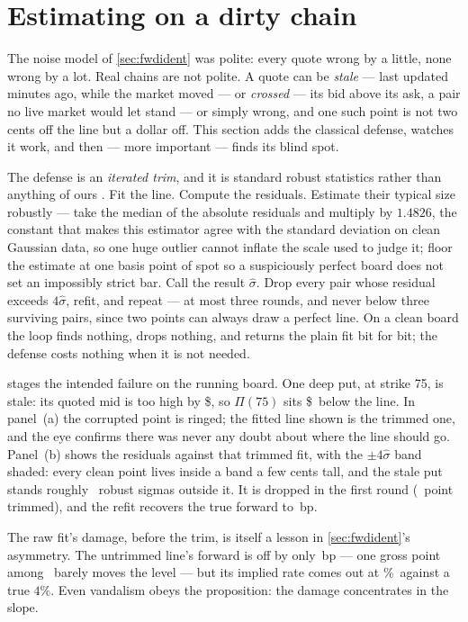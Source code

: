 \section{Estimating on a dirty chain}
\label{sec:fwdtrim}

The noise model of \cref{sec:fwdident} was polite: every quote wrong
by a little, none wrong by a lot.  Real chains are not polite.  A
quote can be \emph{stale} --- last updated minutes ago, while the
market moved --- or \emph{crossed} --- its bid above its ask, a pair
no live market would let stand --- or simply wrong, and one such
point is not two cents off the line but a dollar off.  This section adds the
classical defense, watches it work, and then --- more important ---
finds its blind spot.

The defense is an \emph{iterated trim}, and it is standard robust
statistics rather than anything of ours \citep{RousseeuwLeroy1987}.
Fit the line.  Compute the residuals.  Estimate their typical size
robustly --- take the median of the absolute residuals and multiply by
$1.4826$, the constant that makes this estimator agree with the
standard deviation on clean Gaussian data, so one huge outlier cannot
inflate the scale used to judge it; floor the estimate at one basis
point of spot so a suspiciously perfect board does not set an
impossibly strict bar.  Call the result $\hat\sigma$.  Drop every
pair whose residual exceeds $4\hat\sigma$, refit, and repeat --- at
most three rounds, and never below three surviving pairs, since two
points can always draw a perfect line.  On a clean board the loop
finds nothing, drops nothing, and returns the plain fit bit for bit;
the defense costs nothing when it is not needed.

 stages the intended failure on the running board.
One deep put, at strike 75, is stale: its quoted mid is too high by
\$\MacFwdTrimStaleDollars, so $\Pi(75)$ sits
\$\MacFwdTrimStaleDollars\ below the line.  In
panel~(a) the corrupted point is ringed; the fitted line shown is the
trimmed one, and the eye confirms there was never any doubt about
where the line should go.  Panel~(b) shows the residuals against that
trimmed fit, with the $\pm4\hat\sigma$ band shaded: every clean point
lives inside a band a few cents tall, and the stale put stands roughly
\MacFwdTrimSigmaOut\ robust sigmas outside it.  It is dropped in the
first round (\MacFwdTrimNOut\ point trimmed), and the refit recovers
the true forward to \MacFwdTrimErrBp\,bp.

The raw fit's damage, before the trim, is itself a lesson in
\cref{sec:fwdident}'s asymmetry.  The untrimmed line's forward is off
by only \MacFwdTrimRawErrBp\,bp --- one gross point among
\MacFwdIdentNStrikes\ barely moves the level --- but its implied rate
comes out at \MacFwdTrimRawRatePct\%\ against a true $4\%$.  Even vandalism obeys the proposition: the damage
concentrates in the slope.

